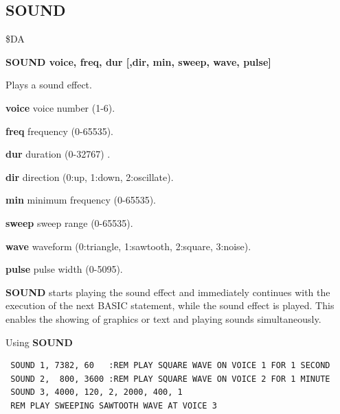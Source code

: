 \subsection{SOUND}
\begin{description}[leftmargin=2cm,style=nextline]
\item [Token:] \$DA
\item [Format:] {\bf SOUND voice, freq, dur
                [,dir, min, sweep, wave, pulse]}

\item [Usage:] Plays a sound effect.

               {\bf voice} voice number (1-6).

               {\bf freq} frequency (0-65535).

               {\bf dur} duration (0-32767) .

               {\bf dir} direction (0:up, 1:down, 2:oscillate).

               {\bf min} minimum frequency (0-65535).

               {\bf sweep} sweep range (0-65535).

               {\bf wave} waveform (0:triangle, 1:sawtooth, 2:square,
               3:noise).

               {\bf pulse} pulse width (0-5095).

\item [Remarks:] {\bf SOUND} starts playing the sound
               effect and immediately continues with the execution
               of the next BASIC statement, while the sound effect
               is played. This enables the showing of graphics or text
               and playing sounds simultaneously.

\item [Examples:] Using {\bf SOUND}
\begin{tcolorbox}[colback=black,coltext=white]
\verbatimfont{\codefont}
\begin{verbatim}
 SOUND 1, 7382, 60   :REM PLAY SQUARE WAVE ON VOICE 1 FOR 1 SECOND
 SOUND 2,  800, 3600 :REM PLAY SQUARE WAVE ON VOICE 2 FOR 1 MINUTE
 SOUND 3, 4000, 120, 2, 2000, 400, 1
 REM PLAY SWEEPING SAWTOOTH WAVE AT VOICE 3
\end{verbatim}
\end{tcolorbox}
\end{description}


\newpage
